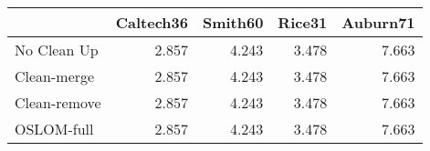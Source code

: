 \begin{tabular}{lrrrr}
\toprule
{} & Caltech36 & Smith60 & Rice31 & Auburn71 \\
\midrule
No Clean Up  &     2.857 &   4.243 &  3.478 &    7.663 \\
Clean-merge  &     2.857 &   4.243 &  3.478 &    7.663 \\
Clean-remove &     2.857 &   4.243 &  3.478 &    7.663 \\
OSLOM-full   &     2.857 &   4.243 &  3.478 &    7.663 \\
\bottomrule
\end{tabular}
